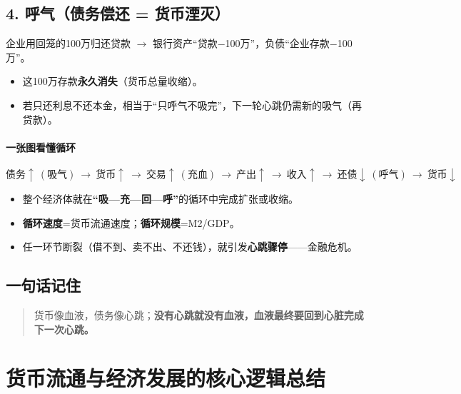 \subsection*{4. 呼气（债务偿还 = 货币湮灭）}
企业用回笼的100万归还贷款 $\rightarrow$ 银行资产“贷款$-$100万”，负债“企业存款$-$100万”。  
\begin{itemize}
  \item 这100万存款\textbf{永久消失}（货币总量收缩）。
  \item 若只还利息不还本金，相当于“只呼气不吸完”，下一轮心跳仍需新的吸气（再贷款）。
\end{itemize}

\paragraph{一张图看懂循环}
\[
\text{债务} \uparrow\ (\text{吸气})\ \rightarrow\ \text{货币} \uparrow\ \rightarrow\ \text{交易} \uparrow\ (\text{充血})\ \rightarrow\ \text{产出} \uparrow\ \rightarrow\ \text{收入} \uparrow\ \rightarrow\ \text{还债} \downarrow\ (\text{呼气})\ \rightarrow\ \text{货币} \downarrow
\]

\begin{itemize}
  \item 整个经济体就在\textbf{“吸—充—回—呼”}的循环中完成扩张或收缩。
  \item \textbf{循环速度}=货币流通速度；\textbf{循环规模}=M2/GDP。
  \item 任一环节断裂（借不到、卖不出、不还钱），就引发\textbf{心跳骤停}——金融危机。
\end{itemize}

\subsection*{一句话记住}

\begin{quote}
货币像血液，债务像心跳；\textbf{没有心跳就没有血液，血液最终要回到心脏完成下一次心跳。}
\end{quote}




\section{货币流通与经济发展的核心逻辑总结}

